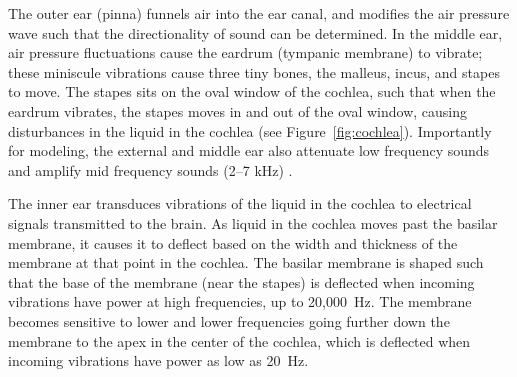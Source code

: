 The outer ear (pinna) funnels air
into the ear canal,
and modifies the air pressure wave
such that the directionality
of sound can be determined.
In the middle ear,
air pressure fluctuations
cause the eardrum (tympanic membrane)
to vibrate;
these miniscule vibrations
cause three tiny bones,
the malleus, incus, and stapes to move.
The stapes sits on the oval window
of the cochlea,
such that when the eardrum vibrates,
the stapes moves in and out of the oval window,
causing disturbances in the liquid
in the cochlea
(see Figure~\ref{fig:cochlea}).
Importantly for modeling,
the external and middle ear
also attenuate low frequency sounds
and amplify mid frequency sounds
(2--7 kHz)
\citep{rosowski1996,ballachanda1997}.


The inner ear transduces vibrations
of the liquid in the cochlea
to electrical signals transmitted
to the brain.
As liquid in the cochlea
moves past the basilar membrane,
it causes it to deflect
based on the width and thickness
of the membrane at that point
in the cochlea.
The basilar membrane
is shaped such that
the base of the membrane
(near the stapes)
is deflected when
incoming vibrations have power
at high frequencies,
up to 20,000~Hz.
The membrane becomes sensitive
to lower and lower frequencies
going further down the membrane
to the apex
in the center of the cochlea,
which is deflected when incoming vibrations
have power as low as 20~Hz.

